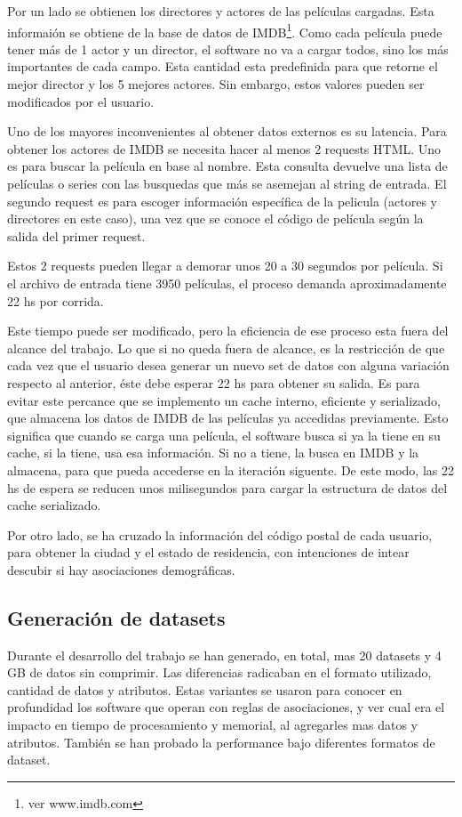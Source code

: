 \documentclass[journal]{IEEEtran}
\begin{document}
Por un lado se obtienen los directores y actores de las películas cargadas. Esta informaión se
obtiene de la base de datos de IMDB\footnote{ver www.imdb.com}. Como cada película puede
tener más de 1 actor y un director, el software no va a cargar todos, sino los más importantes
de cada campo. Esta cantidad esta predefinida para que retorne el mejor director y los 
5 mejores actores. Sin embargo, estos valores pueden ser modificados por el usuario.

Uno de los mayores inconvenientes al obtener datos externos es su latencia. Para obtener
los actores de IMDB se necesita hacer al menos 2 requests HTML. Uno es para buscar la
película en base al nombre. Esta consulta devuelve una lista de películas o series con
las busquedas que más se asemejan al string de entrada. El segundo request es para 
escoger información específica de la pelicula (actores y directores en este caso), una vez
que se conoce el código de película según la salida del primer request.

Estos 2 requests pueden llegar a demorar unos 20 a 30 segundos por película. Si el archivo de
entrada tiene 3950 películas, el proceso demanda aproximadamente 22 hs por corrida.

Este tiempo puede ser modificado, pero la eficiencia de ese proceso esta fuera del alcance del trabajo.
Lo que si no queda fuera de alcance, es la restricción de que cada vez que el usuario desea
generar un nuevo set de datos con alguna variación respecto al anterior, éste debe esperar
22 hs para obtener su salida. Es para evitar este percance que se implemento un cache interno, 
eficiente y serializado, que almacena los datos de IMDB de las películas ya accedidas previamente.
Esto significa que cuando se carga una película, el software busca si ya la tiene en su cache,
 si la tiene, usa esa información. Si no a tiene, la busca en IMDB y la almacena, para que 
pueda accederse en la iteración siguente. De este modo, las 22 hs de espera se reducen 
unos milisegundos para cargar la estructura de datos del cache serializado.

Por otro lado, se ha cruzado la información del código postal de cada usuario, para
obtener la ciudad y el estado de residencia, con intenciones de intear descubir
si hay asociaciones demográficas.

\subsection{Generación de datasets}
Durante el desarrollo del trabajo se han generado, en total, mas 20 datasets y 4 GB de datos sin comprimir. 
Las diferencias radicaban en el formato utilizado, cantidad de datos y atributos. Estas variantes se
usaron para conocer en profundidad los software que operan con reglas de asociaciones, y
ver cual era el impacto en tiempo de procesamiento y memorial, al agregarles mas
datos y atributos.
También se han probado la performance bajo diferentes formatos de dataset.
\end{document}
